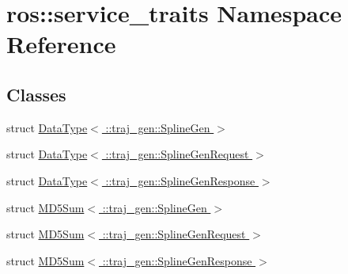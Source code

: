 \hypertarget{namespaceros_1_1service__traits}{}\section{ros\+:\+:service\+\_\+traits Namespace Reference}
\label{namespaceros_1_1service__traits}
\subsection*{Classes}
\begin{DoxyCompactItemize}
\item 
struct \hyperlink{structros_1_1service__traits_1_1_data_type_3_01_1_1traj__gen_1_1_spline_gen_01_4}{Data\+Type$<$ \+::traj\+\_\+gen\+::\+Spline\+Gen $>$}
\item 
struct \hyperlink{structros_1_1service__traits_1_1_data_type_3_01_1_1traj__gen_1_1_spline_gen_request_01_4}{Data\+Type$<$ \+::traj\+\_\+gen\+::\+Spline\+Gen\+Request $>$}
\item 
struct \hyperlink{structros_1_1service__traits_1_1_data_type_3_01_1_1traj__gen_1_1_spline_gen_response_01_4}{Data\+Type$<$ \+::traj\+\_\+gen\+::\+Spline\+Gen\+Response $>$}
\item 
struct \hyperlink{structros_1_1service__traits_1_1_m_d5_sum_3_01_1_1traj__gen_1_1_spline_gen_01_4}{M\+D5\+Sum$<$ \+::traj\+\_\+gen\+::\+Spline\+Gen $>$}
\item 
struct \hyperlink{structros_1_1service__traits_1_1_m_d5_sum_3_01_1_1traj__gen_1_1_spline_gen_request_01_4}{M\+D5\+Sum$<$ \+::traj\+\_\+gen\+::\+Spline\+Gen\+Request $>$}
\item 
struct \hyperlink{structros_1_1service__traits_1_1_m_d5_sum_3_01_1_1traj__gen_1_1_spline_gen_response_01_4}{M\+D5\+Sum$<$ \+::traj\+\_\+gen\+::\+Spline\+Gen\+Response $>$}
\end{DoxyCompactItemize}
